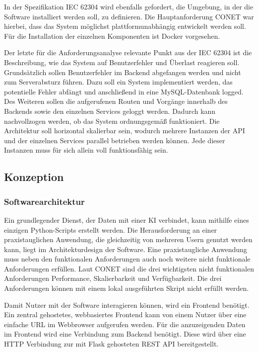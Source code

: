 In der Spezifikation IEC 62304 wird ebenfalls gefordert, die Umgebung, in der die Software installiert werden soll, zu definieren. Die Hauptanforderung CONET war hierbei, dass das System möglichst plattformunabhängig entwickelt werden soll. Für die Installation der einzelnen Komponenten ist Docker vorgesehen.

Der letzte für die Anforderungsanalyse relevante Punkt aus der IEC 62304 ist die Beschreibung, wie das System auf Benutzerfehler und Überlast reagieren soll. Grundsätzlich sollen Benutzerfehler im Backend abgefangen werden und nicht zum Serverabsturz führen. Dazu soll ein System implementiert werden, das potentielle Fehler abfängt und anschließend in eine MySQL-Datenbank logged. Des Weiteren sollen die aufgerufenen Routen und Vorgänge innerhalb des Backends sowie den einzelnen Services geloggt werden. Dadurch kann nachvollzogen werden, ob das System ordnungsgemäß funktioniert. Die Architektur soll horizontal skalierbar sein, wodurch mehrere Instanzen der API und der einzelnen Services parallel betrieben werden können. Jede dieser Instanzen muss für sich allein voll funktionsfähig sein.

\subsection{Konzeption}
\subsubsection{Softwarearchitektur}
Ein grundlegender Dienst, der Daten mit einer KI verbindet, kann mithilfe eines einzigen Python-Scripts erstellt werden. Die Herausforderung an einer praxistauglichen Anwendung, die gleichzeitig von mehreren Usern genutzt werden kann, liegt im  Architekturdesign der Software. Eine praxistaugliche Anwendung muss neben den funktionalen Anforderungen auch noch weitere nicht funktionale Anforderungen erfüllen. Laut CONET sind die drei wichtigsten nicht funktionalen Anforderungen Performance, Skalierbarkeit und Verfügbarkeit. Die drei Anforderungen können mit einem lokal ausgeführten Skript nicht erfüllt werden. 

Damit Nutzer mit der Software interagieren können, wird ein Frontend benötigt. Ein zentral gehostetes, webbasiertes Frontend kann von einem Nutzer über eine einfache URL im Webbrowser aufgerufen werden. Für die anzuzeigenden Daten im Frontend wird eine Verbindung zum Backend benötigt. Diese wird über eine HTTP Verbindung zur mit Flask gehosteten REST API bereitgestellt.

